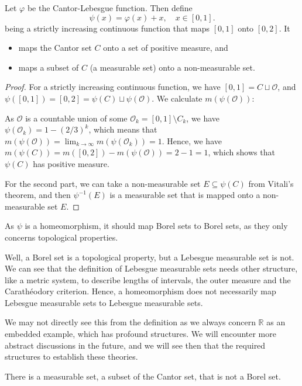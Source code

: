 \documentclass[../main.tex]{subfiles}
\begin{document}
\begin{proposition}{}{}
  Let $\varphi$ be the Cantor-Lebesgue function. Then define
  \begin{equation}
    \psi(x) = \varphi(x) + x, \quad x \in [0, 1].
  \end{equation}
  being a strictly increasing continuous function that maps $[0, 1]$ onto $[0, 2]$. It
  \begin{itemize}
    \item maps the Cantor set $C$ onto a set of positive measure, and
    \item maps a subset of $C$ (a measurable set) onto a non-measurable set.
  \end{itemize}
\end{proposition}
\begin{proof}
  For a strictly increasing continuous function, we have $[0,1] = C \sqcup \mathcal{O}$, and $\psi([0, 1]) = [0, 2] = \psi(C) \sqcup \psi(\mathcal{O})$. We calculate $m(\psi(\mathcal{O}))$:

  As $\mathcal{O}$ is a countable union of some $\mathcal{O}_k = [0, 1] \setminus C_k$, we have $\psi(\mathcal{O}_k) = 1 - (2 / 3)^k$, which means that $m(\psi(\mathcal{O})) = \lim_{k \to \infty} m(\psi(\mathcal{O}_k)) = 1$. Hence, we have $m(\psi(C)) = m([0, 2]) - m(\psi(\mathcal{O})) = 2 - 1 = 1$, which shows that $\psi(C)$ has positive measure.

  For the second part, we can take a non-measurable set $E \subseteq \psi(C)$ from Vitali's theorem, and then $\psi^{-1}(E)$ is a measurable set that is mapped onto a non-measurable set $E$.
\end{proof}

As $\psi$ is a homeomorphism, it should map Borel sets to Borel sets, as they only concerns topological properties.

\begin{remark}
  Well, a Borel set is a topological property, but a Lebesgue measurable set is not. We can see that the definition of Lebesgue measurable sets needs other structure, like a metric system, to describe lengths of intervals, the outer measure and the Carathéodory criterion. Hence, a homeomorphism does not necessarily map Lebesgue measurable sets to Lebesgue measurable sets.

  We may not directly see this from the definition as we always concern $\mathbb{R}$ as an embedded example, which has profound structures. We will encounter more abstract discussions in the future, and we will see then that the required structures to establish these theories.
\end{remark}

\begin{proposition}{}{}
  There is a measurable set, a subset of the Cantor set, that is not a Borel set.
\end{proposition}
\end{document}
